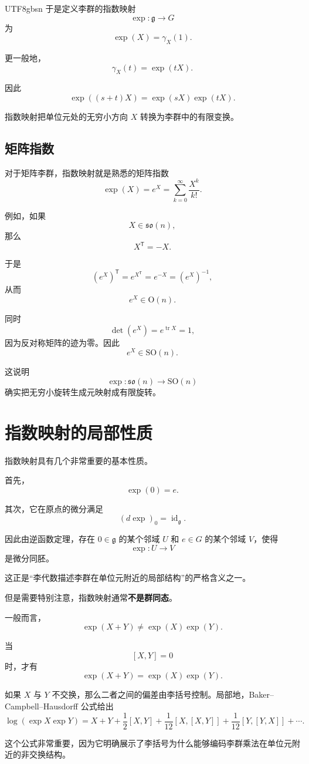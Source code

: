 \documentclass[11pt]{article}
\begin{document}
\begin{CJK*}{UTF8}{gbsn}
于是定义李群的指数映射
\[
\exp:\mathfrak g\to G
\]
为
\[
\boxed{
\exp(X)=\gamma_X(1).
}
\]

更一般地，
\[
\gamma_X(t)
=
\exp(tX).
\]

因此
\[
\exp((s+t)X)
=
\exp(sX)\exp(tX).
\]

指数映射把单位元处的无穷小方向 $X$ 转换为李群中的有限变换。


\subsection{矩阵指数}

对于矩阵李群，指数映射就是熟悉的矩阵指数
\[
\exp(X)
=
e^X
=
\sum_{k=0}^{\infty}\frac{X^k}{k!}.
\]

例如，如果
\[
X\in\mathfrak{so}(n),
\]
那么
\[
X^{\mathsf T}=-X.
\]

于是
\[
(e^X)^{\mathsf T}
=
e^{X^{\mathsf T}}
=
e^{-X}
=
(e^X)^{-1},
\]
从而
\[
e^X\in\mathrm{O}(n).
\]

同时
\[
\det(e^X)
=
e^{\operatorname{tr}X}
=
1,
\]
因为反对称矩阵的迹为零。因此
\[
e^X\in\mathrm{SO}(n).
\]

这说明
\[
\exp:
\mathfrak{so}(n)
\to
\mathrm{SO}(n)
\]
确实把无穷小旋转生成元映射成有限旋转。


\section{指数映射的局部性质}

指数映射具有几个非常重要的基本性质。

首先，
\[
\exp(0)=e.
\]

其次，它在原点的微分满足
\[
(d\exp)_0
=
\operatorname{id}_{\mathfrak g}.
\]

因此由逆函数定理，存在 $0\in\mathfrak g$ 的某个邻域 $U$ 和 $e\in G$ 的某个邻域 $V$，使得
\[
\exp:U\to V
\]
是微分同胚。

这正是“李代数描述李群在单位元附近的局部结构”的严格含义之一。

但是需要特别注意，指数映射通常\textbf{不是群同态}。

一般而言，
\[
\exp(X+Y)
\neq
\exp(X)\exp(Y).
\]

当
\[
[X,Y]=0
\]
时，才有
\[
\exp(X+Y)
=
\exp(X)\exp(Y).
\]

如果 $X$ 与 $Y$ 不交换，那么二者之间的偏差由李括号控制。局部地，Baker--Campbell--Hausdorff 公式给出
\[
\log(\exp X\exp Y)
=
X+Y
+
\frac12[X,Y]
+
\frac1{12}[X,[X,Y]]
+
\frac1{12}[Y,[Y,X]]
+\cdots.
\]

这个公式非常重要，因为它明确展示了李括号为什么能够编码李群乘法在单位元附近的非交换结构。


\end{CJK*}
\end{document}
